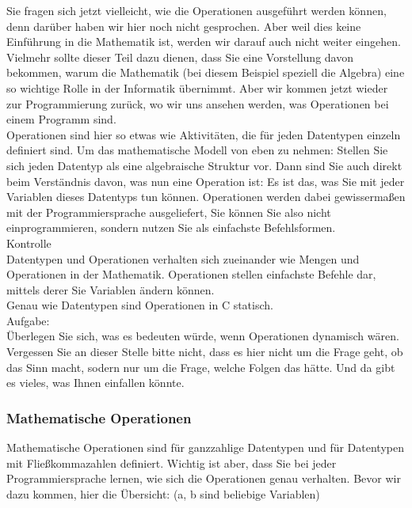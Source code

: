 Sie fragen sich jetzt vielleicht, wie die Operationen ausgeführt werden können, denn darüber haben wir hier noch nicht gesprochen. Aber weil dies keine Einführung in die Mathematik ist, werden wir darauf auch nicht weiter eingehen. Vielmehr sollte dieser Teil dazu dienen, dass Sie eine Vorstellung davon bekommen, warum die Mathematik (bei diesem Beispiel speziell die Algebra) eine so wichtige Rolle in der Informatik übernimmt. Aber wir kommen jetzt wieder zur Programmierung zurück, wo wir uns ansehen werden, was Operationen bei einem Programm sind.\\

Operationen sind hier so etwas wie Aktivitäten, die für jeden Datentypen einzeln definiert sind. Um das mathematische Modell von eben zu nehmen: Stellen Sie sich jeden Datentyp als eine algebraische Struktur vor. Dann sind Sie auch direkt beim Verständnis davon, was nun eine Operation ist: Es ist das, was Sie mit jeder Variablen dieses Datentyps tun können. Operationen werden dabei gewissermaßen mit der Programmiersprache ausgeliefert, Sie können Sie also nicht einprogrammieren, sondern nutzen Sie als einfachste Befehlsformen.\\

Kontrolle\\

Datentypen und Operationen verhalten sich zueinander wie Mengen und Operationen in der Mathematik. Operationen stellen einfachste Befehle dar, mittels derer Sie Variablen ändern können.\\

Genau wie Datentypen sind Operationen in C statisch.\\

Aufgabe:\\

Überlegen Sie sich, was es bedeuten würde, wenn Operationen dynamisch wären. Vergessen Sie an dieser Stelle bitte nicht, dass es hier nicht um die Frage geht, ob das Sinn macht, sodern nur um die Frage, welche Folgen das hätte. Und da gibt es vieles, was Ihnen einfallen könnte.\\

\subsubsection{Mathematische Operationen}

Mathematische Operationen sind für ganzzahlige Datentypen und für Datentypen mit Fließkommazahlen definiert. Wichtig ist aber, dass Sie bei jeder Programmiersprache lernen, wie sich die Operationen genau verhalten. Bevor wir dazu kommen, hier die Übersicht: (a, b sind beliebige Variablen)\\

